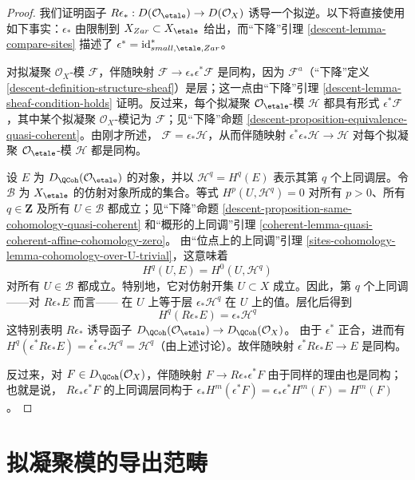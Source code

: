 \begin{proof}
我们证明函子
$R\epsilon_* : D(\mathcal{O}_\etale) \to D(\mathcal{O}_X)$
诱导一个拟逆。以下将直接使用如下事实：$\epsilon_*$ 由限制到
$X_{Zar} \subset X_\etale$ 给出，而“下降”引理
\ref{descent-lemma-compare-sites} 描述了
$\epsilon^* = \text{id}_{small, \etale, Zar}^*$。

\medskip\noindent
对拟凝聚 $\mathcal{O}_X$-模 $\mathcal{F}$，伴随映射
$\mathcal{F} \to \epsilon_*\epsilon^*\mathcal{F}$ 是同构，因为
$\mathcal{F}^a$（“下降”定义
\ref{descent-definition-structure-sheaf}）是层；这一点由“下降”引理
\ref{descent-lemma-sheaf-condition-holds} 证明。反过来，每个拟凝聚
$\mathcal{O}_\etale$-模 $\mathcal{H}$ 都具有形式
$\epsilon^*\mathcal{F}$，其中某个拟凝聚 $\mathcal{O}_X$-模记为
$\mathcal{F}$；见“下降”命题
\ref{descent-proposition-equivalence-quasi-coherent}。由刚才所述，
$\mathcal{F} = \epsilon_*\mathcal{H}$，从而伴随映射
$\epsilon^*\epsilon_*\mathcal{H} \to \mathcal{H}$ 对每个拟凝聚
$\mathcal{O}_\etale$-模 $\mathcal{H}$ 都是同构。

\medskip\noindent
设 $E$ 为 $D_\QCoh(\mathcal{O}_\etale)$ 的对象，并以
$\mathcal{H}^q = H^q(E)$ 表示其第 $q$ 个上同调层。令
$\mathcal{B}$ 为 $X_\etale$ 的仿射对象所成的集合。等式
$H^p(U, \mathcal{H}^q) = 0$ 对所有 $p > 0$、所有
$q \in \mathbf{Z}$ 及所有 $U \in \mathcal{B}$ 都成立；见“下降”命题
\ref{descent-proposition-same-cohomology-quasi-coherent} 和“概形的上同调”引理
\ref{coherent-lemma-quasi-coherent-affine-cohomology-zero}。
由“位点上的上同调”引理
\ref{sites-cohomology-lemma-cohomology-over-U-trivial}，这意味着
$$
H^q(U, E) = H^0(U, \mathcal{H}^q)
$$
对所有 $U \in \mathcal{B}$ 都成立。特别地，它对仿射开集
$U \subset X$ 成立。因此，第 $q$ 个上同调——对 $R\epsilon_*E$ 而言——
在 $U$ 上等于层 $\epsilon_*\mathcal{H}^q$ 在 $U$ 上的值。层化后得到
$$
H^q(R\epsilon_*E) = \epsilon_*\mathcal{H}^q
$$
这特别表明 $R\epsilon_*$ 诱导函子
$D_\QCoh(\mathcal{O}_\etale) \to D_\QCoh(\mathcal{O}_X)$。
由于 $\epsilon^*$ 正合，进而有
$H^q(\epsilon^*R\epsilon_*E) = \epsilon^*\epsilon_*\mathcal{H}^q =
\mathcal{H}^q$（由上述讨论）。故伴随映射
$\epsilon^*R\epsilon_*E \to E$ 是同构。

\medskip\noindent
反过来，对 $F \in D_\QCoh(\mathcal{O}_X)$，伴随映射
$F \to R\epsilon_*\epsilon^*F$ 由于同样的理由也是同构；也就是说，
$R\epsilon_*\epsilon^*F$ 的上同调层同构于
$\epsilon_*H^m(\epsilon^*F) = \epsilon_*\epsilon^*H^m(F) = H^m(F)$。
\end{proof}


\section{拟凝聚模的导出范畴}
\label{section-derived-quasi-coherent}

